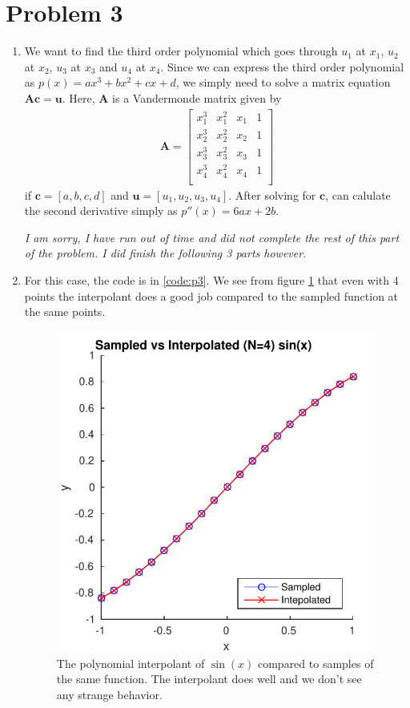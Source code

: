 \documentclass{article}
\begin{document}
\section{Problem 3}
\begin{enumerate}
\item
We want to find the third order polynomial which goes through $u_1$ at $x_1$, $u_2$ at $x_2$, $u_3$ at $x_3$ and $u_4$ at $x_4$.
Since we can express the third order polynomial as $p(x) = ax^3 + bx^2 + cx + d$, we simply need to solve a matrix equation $\mathbf{A} \mathbf{c} = \mathbf{u}$.
Here, $\mathbf{A}$ is a Vandermonde matrix given by
\begin{align}
    \mathbf{A} = \begin{bmatrix}
x^3_1 & x^2_1 & x_1 & 1 \\
x^3_2 & x^2_2 & x_2 & 1 \\
x^3_3 & x^2_3 & x_3 & 1 \\
x^3_4 & x^2_4 & x_4 & 1 \\
\end{bmatrix}
\end{align}
if $\mathbf{c} = [a, b, c, d]$ and $\mathbf{u} = [u_1, u_2, u_3, u_4]$.
After solving for $\mathbf{c}$, can calulate the second derivative simply as $p''(x) = 6ax + 2b$.

\emph{I am sorry, I have run out of time and did not complete the rest of this part of the problem. I did finish the following 3 parts however.}

\item
For this case, the code is in \ref{code:p3}.
We see from figure \ref{fig:p3n4} that even with 4 points the interpolant does a good job compared to the sampled function at the same points.
\begin{figure}[!ht]
\centering
\includegraphics[scale=1]{p3n4.pdf}
\caption{The polynomial interpolant of $\sin(x)$ compared to samples of the same function. The interpolant does well and we don't see any strange behavior.}
\label{fig:p3n4}
\end{figure}


\end{enumerate}
\end{document}
